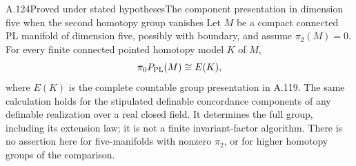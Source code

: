 \begin{saresult}{A.124}{Proved under stated hypotheses}{The component presentation in dimension five when the second homotopy group vanishes}
Let $M$ be a compact connected PL manifold of dimension five,
possibly with boundary, and assume $\pi_2(M)=0$.
For every finite connected pointed homotopy model $K$ of $M$,
\[
 \pi_0P_{\rm PL}(M)\cong E(K),
\]
where $E(K)$ is the complete countable group presentation in
A.119. The same calculation holds for the stipulated definable
concordance components of any definable realization over a real
closed field. It determines the full group, including its
extension law; it is not a finite invariant-factor algorithm.
There is no assertion here for five-manifolds with nonzero
$\pi_2$, or for higher homotopy groups of the comparison.
\end{saresult}

